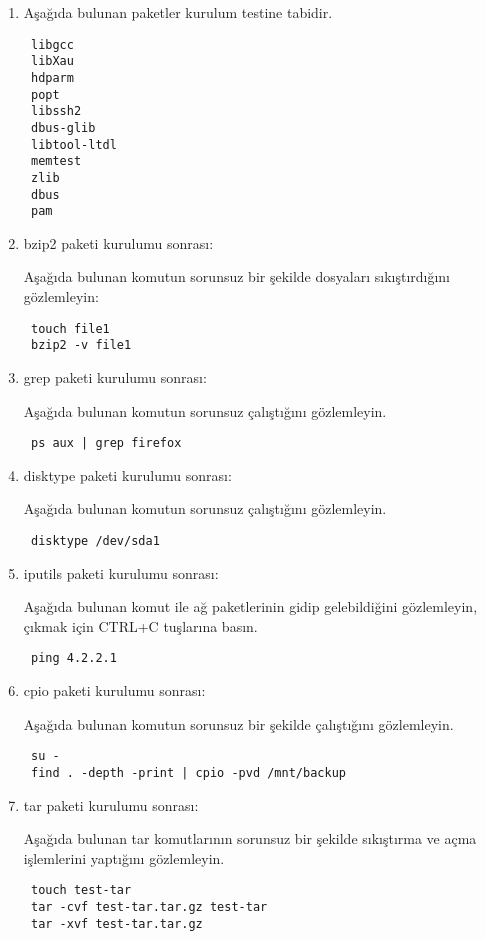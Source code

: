 \documentclass[a4paper,10pt]{article}
\begin{document}
\begin{enumerate}
\item Aşağıda bulunan paketler kurulum testine tabidir.
\begin{verbatim}
 libgcc
 libXau
 hdparm
 popt
 libssh2
 dbus-glib 
 libtool-ltdl 
 memtest 
 zlib
 dbus
 pam
\end{verbatim}

\item bzip2 paketi kurulumu sonrası:

Aşağıda bulunan komutun sorunsuz bir şekilde dosyaları sıkıştırdığını gözlemleyin:

\begin{verbatim}
 touch file1
 bzip2 -v file1
\end{verbatim}

\item grep paketi kurulumu sonrası:

Aşağıda bulunan komutun sorunsuz çalıştığını gözlemleyin.

\begin{verbatim}
 ps aux | grep firefox
\end{verbatim}

\item disktype paketi kurulumu sonrası:

Aşağıda bulunan komutun sorunsuz çalıştığını gözlemleyin.

\begin{verbatim}
 disktype /dev/sda1
\end{verbatim}

\item iputils paketi kurulumu sonrası:

Aşağıda bulunan komut ile ağ paketlerinin gidip gelebildiğini gözlemleyin, çıkmak için CTRL+C tuşlarına basın.
\begin{verbatim}
 ping 4.2.2.1
\end{verbatim}

\item cpio paketi kurulumu sonrası:

Aşağıda bulunan komutun sorunsuz bir şekilde çalıştığını gözlemleyin.
\begin{verbatim}
 su -
 find . -depth -print | cpio -pvd /mnt/backup
\end{verbatim}


\item tar paketi kurulumu sonrası:

Aşağıda bulunan tar komutlarının sorunsuz bir şekilde sıkıştırma ve açma işlemlerini yaptığını gözlemleyin.
\begin{verbatim}
 touch test-tar
 tar -cvf test-tar.tar.gz test-tar 
 tar -xvf test-tar.tar.gz
\end{verbatim}



\end{enumerate}
\end{document}
